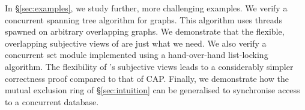In \S\ref{sec:examples}, we study further, more challenging examples. We verify a concurrent spanning tree algorithm for graphs. This algorithm uses threads spawned on arbitrary overlapping graphs. We demonstrate that the flexible, overlapping subjective views of \colosl are just what we need.  We also verify a concurrent set module implemented using a hand-over-hand list-locking algorithm.
%
The flexibility of \colosl's subjective views leads to a considerably simpler correctness proof compared to that of CAP. 
%
Finally, we demonstrate how the mutual exclusion ring of \S\ref{sec:intuition} can be generalised to synchronise access to a concurrent database.


